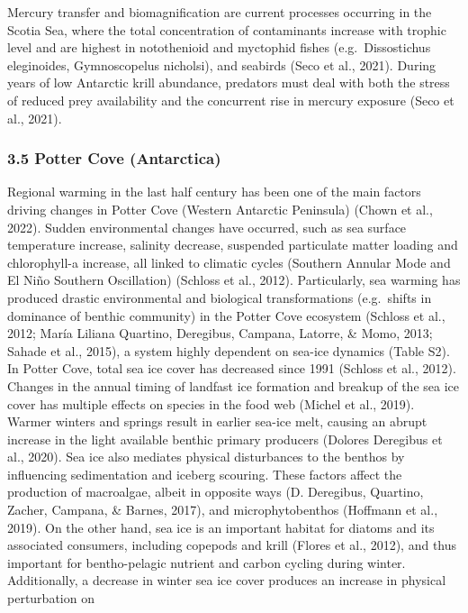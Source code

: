 \documentclass[
]{article}
\begin{document}
Mercury transfer and biomagnification are current processes occurring in
the Scotia Sea, where the total concentration of contaminants increase
with trophic level and are highest in notothenioid and myctophid fishes
(e.g.~Dissostichus eleginoides, Gymnoscopelus nicholsi), and seabirds
(Seco et al., 2021). During years of low Antarctic krill abundance,
predators must deal with both the stress of reduced prey availability
and the concurrent rise in mercury exposure (Seco et al., 2021).

\hypertarget{potter-cove-antarctica}{%
\subsubsection{3.5 Potter Cove
(Antarctica)}\label{potter-cove-antarctica}}

Regional warming in the last half century has been one of the main
factors driving changes in Potter Cove (Western Antarctic Peninsula)
(Chown et al., 2022). Sudden environmental changes have occurred, such
as sea surface temperature increase, salinity decrease, suspended
particulate matter loading and chlorophyll-a increase, all linked to
climatic cycles (Southern Annular Mode and El Niño Southern Oscillation)
(Schloss et al., 2012). Particularly, sea warming has produced drastic
environmental and biological transformations (e.g.~shifts in dominance
of benthic community) in the Potter Cove ecosystem (Schloss et al.,
2012; María Liliana Quartino, Deregibus, Campana, Latorre, \& Momo,
2013; Sahade et al., 2015), a system highly dependent on sea-ice
dynamics (Table S2). In Potter Cove, total sea ice cover has decreased
since 1991 (Schloss et al., 2012). Changes in the annual timing of
landfast ice formation and breakup of the sea ice cover has multiple
effects on species in the food web (Michel et al., 2019). Warmer winters
and springs result in earlier sea-ice melt, causing an abrupt increase
in the light available benthic primary producers (Dolores Deregibus et
al., 2020). Sea ice also mediates physical disturbances to the benthos
by influencing sedimentation and iceberg scouring. These factors affect
the production of macroalgae, albeit in opposite ways (D. Deregibus,
Quartino, Zacher, Campana, \& Barnes, 2017), and microphytobenthos
(Hoffmann et al., 2019). On the other hand, sea ice is an important
habitat for diatoms and its associated consumers, including copepods and
krill (Flores et al., 2012), and thus important for bentho-pelagic
nutrient and carbon cycling during winter. Additionally, a decrease in
winter sea ice cover produces an increase in physical perturbation on
\end{document}
